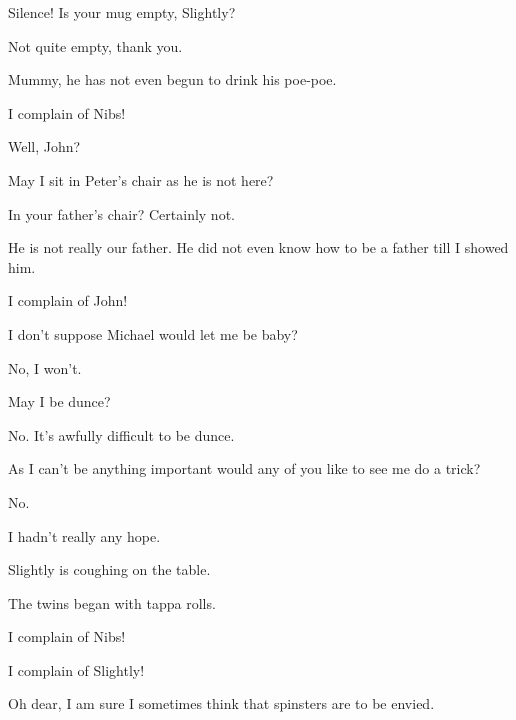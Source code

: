 \begin{drama}

Silence!
Is your mug empty, Slightly?

Not quite empty, thank you.

\nibsspeaks
Mummy, he has not even begun to drink his poe‐poe.

I complain of Nibs!


\wendyspeaks
Well, John?

\johnspeaks
May I sit in Peter’s chair as he is not here?

\wendyspeaks
In your father’s chair?
Certainly not.

\johnspeaks
He is not really our father.
He did not even know how to be a father till I showed him.


\secondtwinspeaks
I complain of John!


I don’t suppose Michael would let me be baby?

\michaelspeaks
No, I won’t.

\tootlesspeaks
May I be dunce?

No.
It’s awfully difficult to be dunce.

\tootlesspeaks
As I can’t be anything important would any of you like to see me do a trick?

No.

I hadn’t really any hope.


\nibsspeaks
Slightly is coughing on the table.

\curlyspeaks
The twins began with tappa rolls.

\slightlyspeaks
I complain of Nibs!

\nibsspeaks
I complain of Slightly!

\wendyspeaks
Oh dear, I am sure I sometimes think that spinsters are to be envied.


\end{drama}
